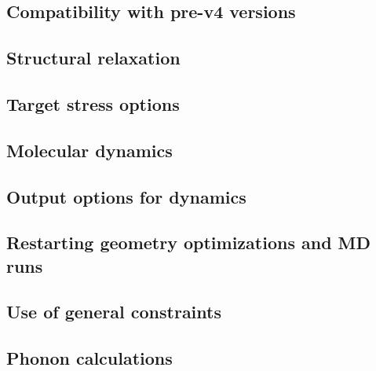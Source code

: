 \subsection{Compatibility with pre-v4 versions}



\subsection{Structural relaxation}



\subsection{Target stress options}



\subsection{Molecular dynamics}



\subsection{Output options for dynamics}



\subsection{Restarting geometry optimizations and MD runs}



\subsection{Use of general constraints}



\subsection{Phonon calculations}


